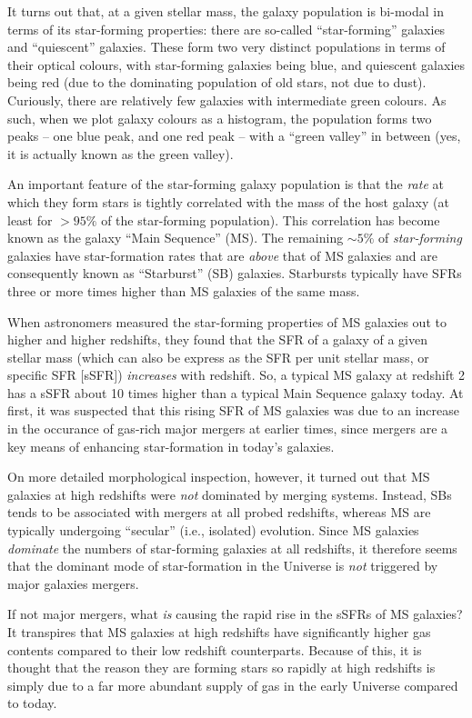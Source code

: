 \documentclass[11pt]{article}
\begin{document}
It turns out that, at a given stellar mass, the galaxy population is
bi-modal in terms of its star-forming properties: there are so-called
``star-forming'' galaxies and ``quiescent'' galaxies. These form two
very distinct populations in terms of their optical colours, with
star-forming galaxies being blue, and quiescent galaxies being red
(due to the dominating population of old stars, not due to
dust). Curiously, there are relatively few galaxies with intermediate
green colours. As such, when we plot galaxy colours as a histogram,
the population forms two peaks -- one blue peak, and one red peak -- with
a ``green valley'' in between (yes, it is actually known as the green
valley).

An important feature of the star-forming galaxy population is that the
{\it rate} at which they form stars is tightly correlated with the
mass of the host galaxy (at least for $>95\%$ of the star-forming
population). This correlation has become known as the galaxy ``Main
Sequence'' (MS). The remaining $\sim5\%$ of {\it star-forming}
galaxies have star-formation rates that are {\it above} that of MS
galaxies and are consequently known as ``Starburst'' (SB)
galaxies. Starbursts typically have SFRs three or more times higher
than MS galaxies of the same mass.

When astronomers measured the star-forming properties of MS galaxies
out to higher and higher redshifts, they found that the SFR of a
galaxy of a given stellar mass (which can also be express as the SFR
per unit stellar mass, or specific SFR $[$sSFR$]$) {\it increases}
with redshift. So, a typical MS galaxy at redshift 2 has a sSFR about
10 times higher than a typical Main Sequence galaxy today. At first,
it was suspected that this rising SFR of MS galaxies was due to an
increase in the occurance of gas-rich major mergers at earlier times,
since mergers are a key means of enhancing star-formation in today's
galaxies.

On more detailed morphological inspection, however, it turned out that
MS galaxies at high redshifts were {\it not} dominated by merging
systems. Instead, SBs tends to be associated with mergers at all
probed redshifts, whereas MS are typically undergoing ``secular''
(i.e., isolated) evolution. Since MS galaxies {\it dominate} the
numbers of star-forming galaxies at all redshifts, it therefore seems
that the dominant mode of star-formation in the Universe is {\it not}
triggered by major galaxies mergers.

If not major mergers, what {\it is} causing the rapid rise in the
sSFRs of MS galaxies? It transpires that MS galaxies at high redshifts
have significantly higher gas contents compared to their low redshift
counterparts. Because of this, it is thought that the reason they are
forming stars so rapidly at high redshifts is simply due to a far more
abundant supply of gas in the early Universe compared to today.
\end{document}
